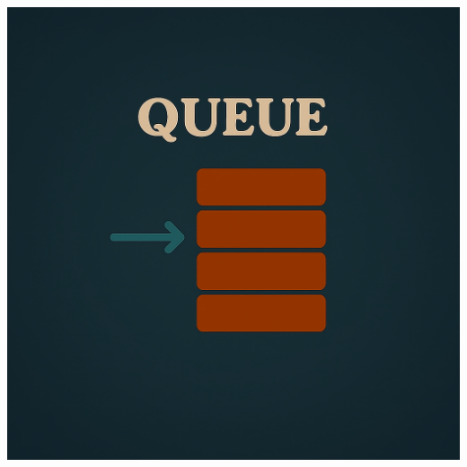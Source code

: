 \documentclass[a4paper,10pt]{book}
\begin{document}
\begin{center}
\includegraphics[height=13.88cm, width=17cm, keepaspectratio]{Pics/queue.png}
\end{center}
\end{document}

